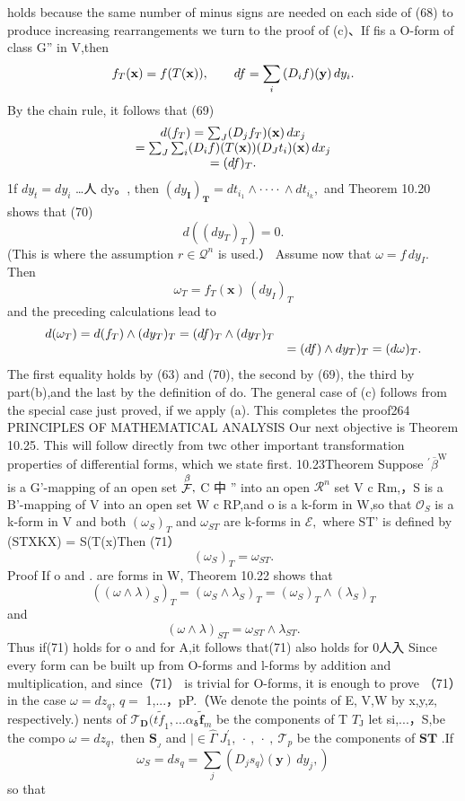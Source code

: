 holds because the same number of minus signs are needed on each side of (68) to produce increasing rearrangements we turn to the proof of (c)、If fis a O-form of class G” in V,then $$ f_{T}({\bf x})=f(T({\bf x})),\qquad d f=\sum_{i}\,(D_{i}f)({\bf y})\,d y_{i}. $$ By the chain rule, it follows that (69) $$ \begin{array}{c}{{d(f_{T})=\sum_{J}(D_{j}f_{T})({\bf x})\,d x_{j}}}\\ {{=\sum_{J}\sum_{i}(D_{i}f)(T({\bf x}))(D_{J}t_{i})({\bf x})\,d x_{j}}}\\ {{=(d f)_{T}.}}\end{array} $$ 1f $d y_{t}=d y_{i}$ …人 dy。, then $(d y_{\boldsymbol{I}})_{\boldsymbol{T}}=d t_{i_{1}}\wedge\mathbf{\boldsymbol{\cdot\cdot\cdot\cdot}}\wedge d t_{i_{k}},$ and Theorem 10.20 shows that (70) $$ d((d y_{T})_{T})=0. $$ (This is where the assumption $r\in{\mathcal{Q}}^{n}$ is used.） Assume now that $\omega=f\,d y_{I}.$ Then $$ \omega_{T}=f_{T}(\mathbf{x})\,(d y_{I})_{T} $$ and the preceding calculations lead to $$ \begin{array}{c c c}{{d(\omega_{T})=d(f_{T})\wedge(d y_{T})_{T}=(d f)_{T}\wedge(d y_{T})_{T}}}\\ {{}}&{{=(d f)\wedge d y_{T})_{T}=(d\omega)_{T}.}}\end{array} $$ The first equality holds by (63) and (70), the second by (69), the third by part(b),and the last by the definition of do. The general case of (c) follows from the special case just proved, if we apply (a). This completes the proof264 PRINCIPLES OF MATHEMATICAL ANALYSIS Our next objective is Theorem 10.25. This will follow directly from twc other important transformation properties of differential forms, which we state first. 10.23Theorem Suppose ${}^{\prime}{\overline{{\beta}}}^{\mathrm{W}}$ is a G'-mapping of an open set $\stackrel{\beta}{\cal F},$ C 中 ” into an open $\textstyle{\mathcal{R}}^{n}$ set V c Rm,，S is a B'-mapping of V into an open set W c RP,and o is a k-form in W,so that ${\mathcal{O}}_{S}$ is a k-form in V and both $(\omega_{S})_{T}$ and $\omega_{S T}$ are k-forms in ${\mathcal{E}},$ where ST' is defined by (STXKX) = S(T(x)Then (71） $$ (\omega_{S})_{T}=\omega_{S T}. $$ Proof If o and . are forms in W, Theorem 10.22 shows that $$ ((\omega\wedge\lambda)_{S})_{T}=(\omega_{S}\wedge\lambda_{S})_{T}=(\omega_{S})_{T}\wedge(\lambda_{S})_{T} $$ and $$ (\omega\wedge\lambda)_{S T}=\omega_{S T}\wedge\lambda_{S T}. $$ Thus if(71) holds for o and for A,it follows that(71) also holds for 0人入 Since every form can be built up from O-forms and l-forms by addition and multiplication, and since（71） is trivial for O-forms, it is enough to prove （71）in the case $\omega=d z_{q},\,q=$ 1,...，pP.（We denote the points of E, V,W by x,y,z, respectively.) nents of $\mathcal{T}_{\mathbf{D}}(t\tilde{\mathit{f}}_{1},\ldots\alpha_{\mathbf{\delta}}\tilde{\mathbf{f}}_{m}$ be the components of T $T_{\mathrm{{J}}}$ let si,...，S,be the compo $\omega=d z_{q},$ then $\mathbf{S}_{\!_{J}}$ and $\vert\in\hat{\Gamma}~J_{1}^{\prime},~\cdot~,~\cdot~,~{\mathcal{T}}_{p}$ be the components of ${\boldsymbol{S}}{\boldsymbol{T}}$ .If $$ \omega_{S}=d s_{q}=\sum_{j}\left(D_{j}s_{q}\rangle(\mathbf{y})\,d y_{j},\right) $$ so that 